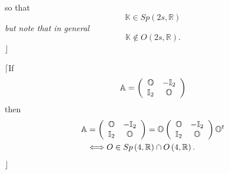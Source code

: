 \documentclass[aps,preprint]{revtex4}%
\begin{document}
so that
\begin{equation}
\mathbb{K\in}Sp\left(  2s,\mathbb{R}\right)
\end{equation}
\emph{but note that in general}
\begin{equation}
\mathbb{K\notin}O\left(  2s,\mathbb{R}\right)  .
\end{equation}
$\rfloor$

$\lceil$If
\begin{equation}
\mathbb{A}=\left(
\begin{array}
[c]{cc}%
\mathbb{O} & -\mathbb{I}_{2}\\
\mathbb{I}_{2} & \mathbb{O}%
\end{array}
\right)
\end{equation}
then
\begin{align}
\mathbb{A}  &  =\left(
\begin{array}
[c]{cc}%
\mathbb{O} & -\mathbb{I}_{2}\\
\mathbb{I}_{2} & \mathbb{O}%
\end{array}
\right)  =\mathbb{O}\left(
\begin{array}
[c]{cc}%
\mathbb{O} & -\mathbb{I}_{2}\\
\mathbb{I}_{2} & \mathbb{O}%
\end{array}
\right)  \mathbb{O}^{t}\\
&  \Longleftrightarrow O\in Sp\left(  4,\mathbb{R}\right)  \cap O\left(
4,\mathbb{R}\right)  .
\end{align}
$\rfloor$
\end{document}
